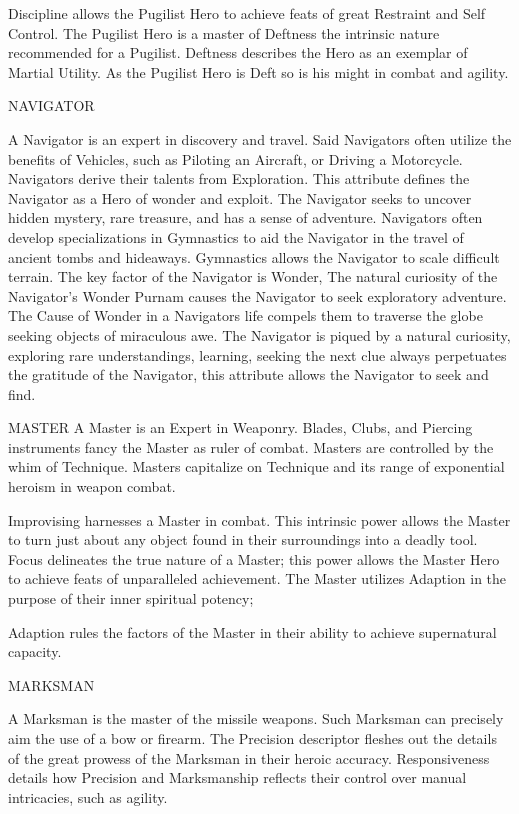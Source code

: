 \documentclass{article}
\begin{document}
	Discipline allows the Pugilist Hero to achieve feats of great Restraint and Self Control. The
Pugilist Hero is a master of Deftness the intrinsic nature recommended for a Pugilist. Deftness
describes the Hero as an exemplar of Martial Utility. As the Pugilist Hero is Deft so is his might
in combat and agility.

NAVIGATOR

	A Navigator is an expert in discovery and travel. Said Navigators often utilize the benefits of
Vehicles, such as Piloting an Aircraft, or Driving a Motorcycle. Navigators derive their talents
from Exploration. This attribute defines the Navigator as a Hero of wonder and exploit. The
Navigator seeks to uncover hidden mystery, rare treasure, and has a sense of adventure.
Navigators often develop specializations in Gymnastics to aid the Navigator in the travel of
ancient tombs and hideaways. Gymnastics allows the Navigator to scale difficult terrain.
The key factor of the Navigator is Wonder, The natural curiosity of the Navigator’s Wonder
Purnam causes the Navigator to seek exploratory adventure. The Cause of Wonder in a
Navigators life compels them to traverse the globe seeking objects of miraculous awe. The
Navigator is piqued by a natural curiosity, exploring rare understandings, learning, seeking the
next clue always perpetuates the gratitude of the Navigator, this attribute allows the Navigator to
seek and find.

MASTER
	A Master is an Expert in Weaponry. Blades, Clubs, and Piercing instruments fancy the Master as
ruler of combat. Masters are controlled by the whim of Technique. Masters capitalize on
Technique and its range of exponential heroism in weapon combat.

	Improvising harnesses a Master in combat. This intrinsic power allows the Master to turn just
about any object found in their surroundings into a deadly tool. Focus delineates the true nature
of a Master; this power allows the Master Hero to achieve feats of unparalleled achievement. The
Master utilizes Adaption in the purpose of their inner spiritual potency;
	
    Adaption rules the factors of the Master in their ability to achieve supernatural capacity.

MARKSMAN

	A Marksman is the master of the missile weapons. Such Marksman can precisely aim the use of
a bow or firearm. The Precision descriptor fleshes out the details of the great prowess of the
Marksman in their heroic accuracy. Responsiveness details how Precision and Marksmanship
reflects their control over manual intricacies, such as agility.
\end{document}
